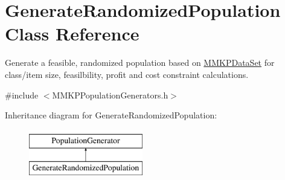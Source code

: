 \hypertarget{class_generate_randomized_population}{\section{Generate\+Randomized\+Population Class Reference}
\label{class_generate_randomized_population}
}


Generate a feasible, randomized population based on \hyperlink{class_m_m_k_p_data_set}{M\+M\+K\+P\+Data\+Set} for class/item size, feasilbility, profit and cost constraint calculations.  




{\ttfamily \#include $<$M\+M\+K\+P\+Population\+Generators.\+h$>$}

Inheritance diagram for Generate\+Randomized\+Population\+:\begin{figure}[H]
\begin{center}
\leavevmode
\includegraphics[height=2.000000cm]{class_generate_randomized_population}
\end{center}
\end{figure}
